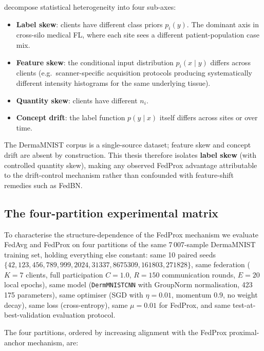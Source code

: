 \citet{kairouz2021advances} decompose statistical heterogeneity into
four sub-axes:
\begin{itemize}
  \item \textbf{Label skew}: clients have different class priors
        $p_i(y)$. The dominant axis in cross-silo medical FL, where
        each site sees a different patient-population case mix.
  \item \textbf{Feature skew}: the conditional input distribution
        $p_i(x \mid y)$ differs across clients (e.g.\ scanner-specific
        acquisition protocols producing systematically different
        intensity histograms for the same underlying tissue).
  \item \textbf{Quantity skew}: clients have different $n_i$.
  \item \textbf{Concept drift}: the label function $p(y \mid x)$
        itself differs across sites or over time.
\end{itemize}

The DermaMNIST corpus \citep{yang2023medmnistv2} is a single-source
dataset; feature skew and concept drift are absent by construction.
This thesis therefore isolates \textbf{label skew} (with controlled
quantity skew), making any observed FedProx advantage attributable to
the drift-control mechanism rather than confounded with feature-shift
remedies such as FedBN.

\subsection{The four-partition experimental matrix}
\label{sec:stat-het-matrix}

To characterise the structure-dependence of the FedProx mechanism we
evaluate FedAvg and FedProx on four partitions of the same 7\,007-sample
DermaMNIST training set, holding everything else constant: same 10
paired seeds $\{42, 123, 456, 789, 999, 2024, 31337, 8675309, 161803, 271828\}$,
same federation ($K=7$ clients, full participation $C=1.0$, $R=150$
communication rounds, $E=20$ local epochs), same model
(\texttt{DermMNISTCNN} with GroupNorm normalisation, 423\,175 parameters),
same optimiser (SGD with $\eta = 0.01$, momentum $0.9$, no weight decay),
same loss (cross-entropy), same $\mu = 0.01$ for FedProx, and same
test-at-best-validation evaluation protocol.

The four partitions, ordered by increasing alignment with the FedProx
proximal-anchor mechanism, are:

